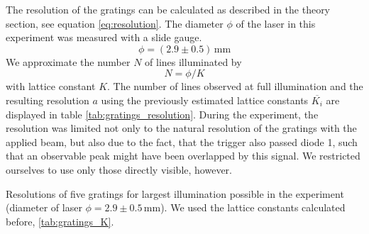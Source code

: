 The resolution of the gratings can be calculated as described in the theory section, 
see equation \eqref{eq:resolution}.
The diameter $\phi$ of the laser in this experiment was measured with a slide gauge. 
\begin{equation}
    \phi = (2.9 \pm 0.5) \, \mathrm{mm}
\end{equation}
We approximate the number $N$ of lines illuminated by
\begin{equation}
    N = \phi / K
\end{equation}
with lattice constant $K$. The number of lines observed at full illumination and the
resulting resolution $a$ using the previously estimated lattice constants $\overline{K_i}$
are displayed in table \ref{tab:gratings_resolution}. During the experiment, the resolution was 
limited not only to the natural resolution of the gratings with the applied beam, but 
also due to the fact, that the trigger also passed diode 1, such that an observable peak
might have been overlapped by this signal. We restricted ourselves to use only those
directly visible, however. 

\begin{table}[htdp]
    \centering
    
    \caption{
        Resolutions of five gratings for largest illumination possible 
        in the experiment (diameter of laser $\phi = 2.9 \pm 0.5\,$mm). 
        We used the lattice constants calculated before, \ref{tab:gratings_K}. 
        }
    \label{tab:gratings_resolution}
\end{table}

